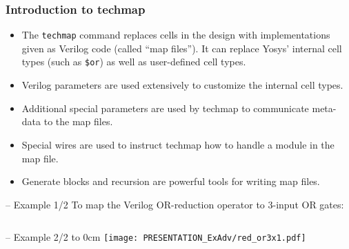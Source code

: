 \begin{frame}
\subsectionpage
\subsectionpagesuffix
\end{frame}

\subsubsection{Introduction to techmap}

\begin{frame}{\subsubsecname}
\begin{itemize}
\item
The {\tt techmap} command replaces cells in the design with implementations given
as Verilog code (called ``map files''). It can replace Yosys' internal cell
types (such as {\tt \$or}) as well as user-defined cell types.
\medskip\item
Verilog parameters are used extensively to customize the internal cell types.
\medskip\item
Additional special parameters are used by techmap to communicate meta-data to the
map files.
\medskip\item
Special wires are used to instruct techmap how to handle a module in the map file.
\medskip\item
Generate blocks and recursion are powerful tools for writing map files.
\end{itemize}
\end{frame}

\begin{frame}[t]{\subsubsecname{} -- Example 1/2}
\vskip-0.2cm
To map the Verilog OR-reduction operator to 3-input OR gates:
\vskip-0.2cm
\begin{columns}


\end{columns}
\end{frame}

\begin{frame}[t]{\subsubsecname{} -- Example 2/2}
\vbox to 0cm{
\hfil\texttt{[image: PRESENTATION\_ExAdv/red\_or3x1.pdf]}
\vss
}
\begin{columns}
\column[t]{6cm}
\column[t]{4cm}
\vskip-0.6cm
\vskip-0.2cm
\end{columns}
\end{frame}

